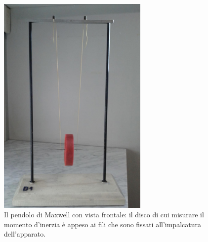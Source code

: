 \begin{itemize}
\begin{figure}[htbp]
        \includegraphics[width=0.65\textwidth]{image/Pendolo_di_Maxwell.jpeg}
        \caption[\small Il pendolo di Maxwell.]{\small Il pendolo di Maxwell con vista frontale: il disco di cui misurare il momento d'inerzia è appeso ai fili che sono fissati all'impalcatura dell'apparato.}
        \label{pendolo_di_maxwel}
    \end{figure}\\
\end{itemize}